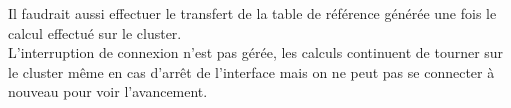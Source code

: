 \documentclass[12pt,a4paper]{article}
\begin{document}
    Il faudrait aussi effectuer le transfert de la table de référence
    générée une fois le calcul effectué sur le cluster.\\
    
    L'interruption de
    connexion n'est pas gérée, les calculs continuent de tourner sur le cluster
    même en cas d'arrêt de l'interface mais on ne peut pas se connecter à
    nouveau pour voir l'avancement.
\end{document}
